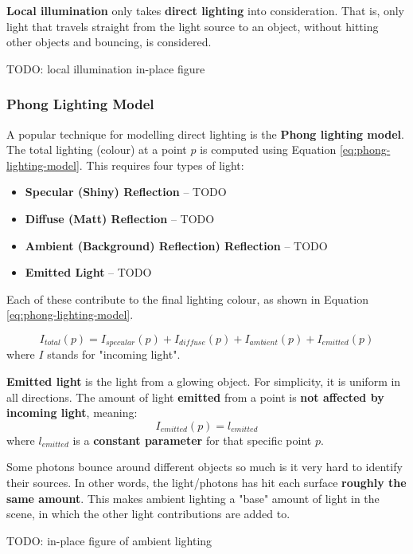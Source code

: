 \documentclass{article}
\begin{document}
\textbf{Local illumination} only takes \textbf{direct lighting} into consideration. That is, only light that travels straight from the light source to an object, without hitting other objects and bouncing, is considered.

TODO: local illumination in-place figure

\subsubsection{Phong Lighting Model}

A popular technique for modelling direct lighting is the \textbf{Phong lighting model}. The total lighting (colour) at a point $p$ is computed using Equation \ref{eq:phong-lighting-model}. This requires four types of light:
\begin{itemize}
	\item \textbf{Specular (Shiny) Reflection} -- TODO
	\item \textbf{Diffuse (Matt) Reflection} -- TODO
	\item \textbf{Ambient (Background) Reflection) Reflection} -- TODO
	\item \textbf{Emitted Light} -- TODO
\end{itemize}
Each of these contribute to the final lighting colour, as shown in Equation \ref{eq:phong-lighting-model}.

\begin{equation}
	I_{total}(p) = I_{specular}(p) + I_{diffuse}(p) + I_{ambient}(p) + I_{emitted}(p)
	\label{eq:phong-lighting-model}
\end{equation}
where $I$ stands for "incoming light".

\textbf{Emitted light} is the light from a glowing object. For simplicity, it is uniform in all directions. The amount of light \textbf{emitted} from a point is \textbf{not affected by incoming light}, meaning:
\begin{equation}
	I_{emitted}(p) = l_{emitted}
	\label{eq:phong-emitted}
\end{equation}
where $l_{emitted}$ is a \textbf{constant parameter} for that specific point $p$.

Some photons bounce around different objects so much is it very hard to identify their sources. In other words, the light/photons has hit each surface \textbf{roughly the same amount}. This makes ambient lighting a "base" amount of light in the scene, in which the other light contributions are added to.

TODO: in-place figure of ambient lighting
\end{document}
